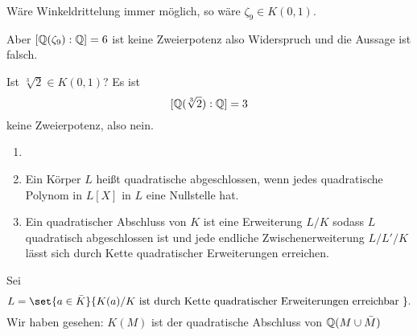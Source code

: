 \begin{Kor}
    Wäre Winkeldrittelung immer möglich, so wäre \(\zeta_9\in K(0,1)\).
    \begin{center}\end{center}
    Aber \([\mathbb{Q}(\zeta_9):\mathbb{Q}]=6\) ist keine Zweierpotenz also Widerspruch und die Aussage ist falsch.
\end{Kor}
\begin{Kor}[Würfelverdoppelung]
Ist \(\sqrt[3]{2}\in K(0,1)\)? Es ist \[[\mathbb{Q}(\sqrt[3]{2}):\mathbb{Q}]=3\] keine Zweierpotenz, also nein.
    
\end{Kor}
\begin{Def}
    \begin{enumerate}
        \item[]
        \item Ein Körper \(L\) heißt quadratische abgeschlossen, wenn jedes quadratische Polynom in \(L[X]\) in \(L\) eine Nullstelle hat.
        \item Ein quadratischer Abschluss von \(K\) ist eine Erweiterung \(L/K\) sodass \(L\) quadratisch abgeschlossen ist und jede endliche Zwischenerweiterung \(L/L'/K\) lässt sich durch Kette quadratischer Erweiterungen erreichen.
    \end{enumerate}
\end{Def}
\begin{Bem}
    Sei \[L=\set{a\in\bar K}{ K(a)/K \text{ ist durch Kette quadratischer Erweiterungen erreichbar }}.\]
    Wir haben gesehen: \(K(M)\) ist der quadratische Abschluss von \(\mathbb{Q}(M\cup\bar M)\)
\end{Bem}
